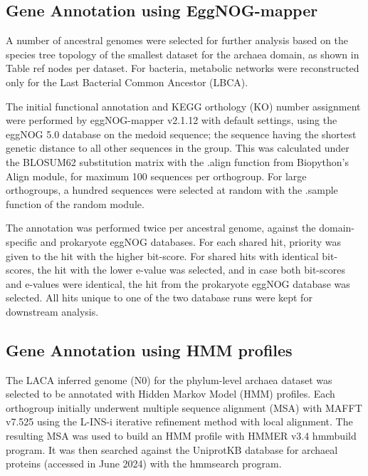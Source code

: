 \subsection*{Gene Annotation using EggNOG-mapper}


A number of ancestral genomes were selected for further analysis based on the species tree topology of the smallest dataset for the archaea domain, as shown in Table ref nodes per dataset. For bacteria, metabolic networks were reconstructed only for the Last Bacterial Common Ancestor (LBCA).

The initial functional annotation and KEGG orthology (KO) number assignment were performed by eggNOG-mapper v2.1.12 \cite{cantalapiedra2021} with default settings, using the eggNOG 5.0 database \cite{huerta-cepas2019} on the medoid sequence; the sequence having the shortest genetic distance to all other sequences in the group. This was calculated under the BLOSUM62 substitution matrix \cite{henikoff1992} with the .align function from Biopython's Align module, for maximum 100 sequences per orthogroup. For large orthogroups, a hundred sequences were selected at random with the .sample function of the random module. 

The annotation was performed twice per ancestral genome, against the domain-specific and prokaryote eggNOG databases. For each shared hit, priority was given to the hit with the higher bit-score. For shared hits with identical bit-scores, the hit with the lower e-value was selected, and in case both bit-scores and e-values were identical, the hit from the prokaryote eggNOG database was selected. All hits unique to one of the two database runs were kept for downstream analysis. 


\subsection*{Gene Annotation using HMM profiles}


The LACA inferred genome (N0) for the phylum-level archaea dataset was selected to be annotated with Hidden Markov Model (HMM) profiles. Each orthogroup initially underwent multiple sequence alignment (MSA) with MAFFT v7.525 \cite{katoh2013} using the L-INS-i iterative refinement method with local alignment. The resulting MSA was used to build an HMM profile with HMMER v3.4 hmmbuild program. It was then searched against the UniprotKB database \cite{theuniprotconsortium2023} for archaeal proteins (accessed in June 2024) with the hmmsearch program.


